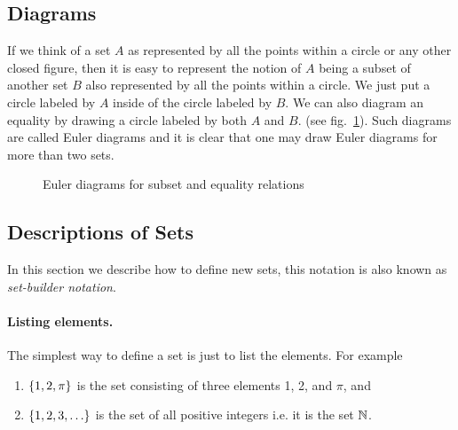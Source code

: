 

\subsection{Diagrams}
If we think of a set $A$ as represented by all the points within a circle or
any other closed figure, then it is easy to represent the notion of $A$ being a
subset of another set $B$ also represented by all the points within a circle.
We just put a circle labeled by $A$ inside of the circle labeled by $B$. We can
also diagram an equality by drawing a circle labeled by both $A$ and $B$. (see
fig.~\ref{figure:euler-diagram}). Such diagrams are called Euler diagrams and
it is clear that one may draw Euler diagrams for more than two sets.

\begin{figure}
    \centering
    \qquad\qquad
    \caption{Euler diagrams for subset and equality relations}
    \label{figure:euler-diagram}
\end{figure}


\subsection{Descriptions of Sets}
In this section we describe how to define new sets, this notation is also
known as \emph{set-builder notation}.

\paragraph{Listing elements.} The simplest way to define a set is just to list
the elements. For example
\begin{enumerate}
  \item $\set{1, 2, \pi}$ is the set consisting of three elements 1, 2, and
    $\pi$, and
  \item $\set{1, 2, 3, \dots}$ is the set of all positive integers i.e. it is
    the set ${\mathbb{N}}$.
\end{enumerate}

